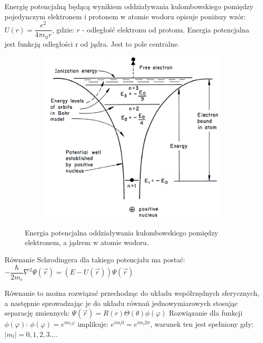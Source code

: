 Energię potencjalną będącą wynikiem oddziaływania kulombowskiego pomiędzy pojedynczym elektronem i protonem w atomie wodoru opisuje poniższy wzór:\newline
$ U(r) = \dfrac{e^2}{4\pi \epsilon_0 r} $, gdzie:\newline
$ r $ - odległość elektronu od protonu.\newline
Energia potencjalna jest funkcją odległości r od jądra. Jest to pole centralne.

\begin{figure} [H]
	\centering
	\begin{subfigure}{.99\textwidth}
		\centering
		\includegraphics[width=1.0\linewidth]{generalIssues/Figures/potential.png}
	\end{subfigure}
	\caption{Energia potencjalna oddziaływania kulombowskiego pomiędzy elektronem, a jądrem w atomie wodoru.}
	\label{maxwell}
\end{figure}

Równanie Schrodingera dla takiego potencjału ma postać:\newline
$ -\dfrac{\hbar}{2m_e} \nabla^2 \Psi(\vec{r}) = (E-U(\vec{r})) \Psi(\vec{r}) $\newline

Równanie to można rozwiązać przechodząc do układu współrzędnych sferycznych, a następnie sprowadzając je do układu równań jednowymiarowych stosując separację zmiennych:\newline
$ \Psi(\vec{r}) = R(r)\Theta(\theta)\phi(\varphi) $\newline
Rozwiązanie dla funkcji $ \phi(\varphi) $:\newline
$ \phi(\varphi) = e^{im_l \varphi} $ implikuje:\newline
$ e^{im_l 0} = e^{im_l 2\pi} $, warunek ten jest spełniony gdy:\newline
$ |m_l| = 0, 1, 2, 3 ... $.

